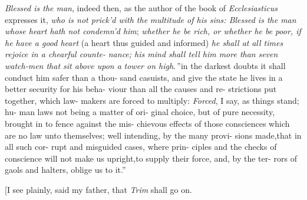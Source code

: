 \documentclass{article}
\begin{document}
\lqq \textit{Blessed is the man}, indeed then, as\break
\lqq the author of the book of \textit{Ecclesiasticus}\break
\lqq expresses it, \textit{who is not prick’d with the}\break
\lqq \textit{multitude of his sins: Blessed is the man}\break
\lqq \textit{whose heart hath not condemn’d him};\break
\lqq \textit{whether he be rich, or whether he be}\break
\lqq \textit{poor, if he have a good heart} (a heart\break
\lqq thus guided and informed) \textit{he shall at}\break
\lqq \textit{all times rejoice in a chearful counte-}\break
\lqq \textit{nance; his mind shall tell him more than}
\lqq \textit{seven watch-men that sit above upon a}\break
\lqq \textit{tower on high}.\,” \lqq in the darkest doubts\break
\lqq it shall conduct him safer than a thou-\break
\lqq sand casuists, and give the state he\break
\lqq lives in a better security for his beha-\break
\lqq viour than all the causes and re-\break
\lqq strictions put together, which law-\break
\lqq makers are forced to multiply:\tsh\break
\lqq \textit{Forced}, I say, as things stand; hu-\break
\lqq man laws not being a matter of ori-\break
\lqq ginal choice, but of pure necessity,\break
\lqq brought in to fence against the mis-\break
\lqq chievous effects of those consciences\break
\lqq which are no law unto themselves;\break
\lqq well intending, by the many provi-\break
\lqq sions made,\tsh that in all such cor-\break
\lqq rupt and misguided cases, where prin-\break
\lqq ciples and the checks of conscience\break
\lqq will not make us upright,\tsh to
\lqq supply their force, and, by the ter-\break
\lqq rors of gaols and halters, oblige us\break
\lqq to it.”

[I see plainly, said my father, that\break
{}
\textit{Trim} shall go on.
\end{document}
